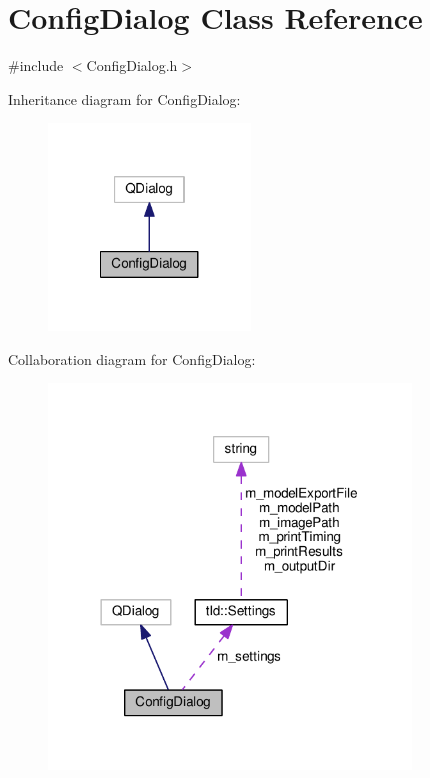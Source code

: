 \hypertarget{classConfigDialog}{\section{Config\-Dialog Class Reference}
\label{classConfigDialog}
}


{\ttfamily \#include $<$Config\-Dialog.\-h$>$}



Inheritance diagram for Config\-Dialog\-:\nopagebreak
\begin{figure}[H]
\begin{center}
\leavevmode
\includegraphics[width=152pt]{classConfigDialog__inherit__graph}
\end{center}
\end{figure}


Collaboration diagram for Config\-Dialog\-:\nopagebreak
\begin{figure}[H]
\begin{center}
\leavevmode
\includegraphics[width=273pt]{classConfigDialog__coll__graph}
\end{center}
\end{figure}
